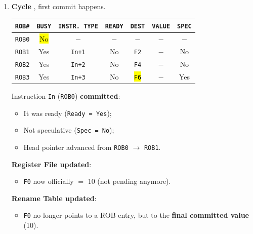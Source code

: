 \begin{examplebox}
\begin{enumerate}
        \item \textbf{Cycle \theenumi}, first commit happens.
        \begin{center}
            \begin{tabular}{@{} c | c | c | c | c | c | c @{}}
                \toprule
                \texttt{ROB\#} & \texttt{BUSY} & \texttt{INSTR. TYPE} & \texttt{READY} & \texttt{DEST} & \texttt{VALUE} & \texttt{SPEC} \\
                \midrule
                \texttt{ROB0} & \hl{No}     & $-$                   & $-$       & $-$               & $-$       & $-$           \\ [.3em]
                \texttt{ROB1} & Yes         & \texttt{In+1}         & No        & \texttt{F2}       & $-$       & No            \\ [.3em]
                \texttt{ROB2} & Yes         & \texttt{In+2}         & No        & \texttt{F4}       & $-$       & No            \\ [.3em]
                \texttt{ROB3} & Yes         & \texttt{In+3}         & No        & \hl{\texttt{F6}}  & $-$       & Yes           \\
                \bottomrule
            \end{tabular}
        \end{center}
        Instruction \texttt{In} (\texttt{ROB0}) \textbf{committed}:
        \begin{itemize}[label=\textcolor{Green3}{}]
            \item It was ready (\texttt{Ready = Yes});
            \item Not speculative (\texttt{Spec = No});
            \item Head pointer advanced from \texttt{ROB0} $\rightarrow$ \texttt{ROB1}.
        \end{itemize}
        \textbf{Register File updated}:
        \begin{itemize}
            \item \texttt{F0} now officially $=$ 10 (not pending anymore).
        \end{itemize}
        \textbf{Rename Table updated}:
        \begin{itemize}
            \item \texttt{F0} no longer points to a ROB entry, but to the \textbf{final committed value} (10).
        \end{itemize}

\end{enumerate}
\end{examplebox}
